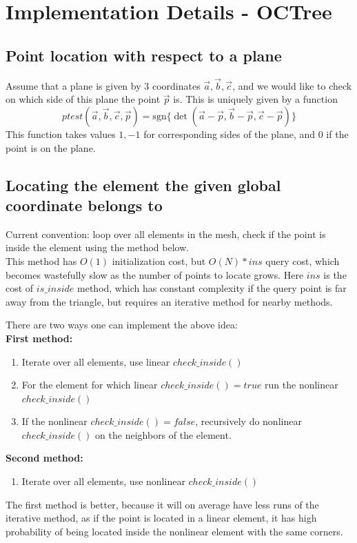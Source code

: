 \section{Implementation Details - OCTree}
\label{impl-octree}

\subsection{Point location with respect to a plane}

Assume that a plane is given by 3 coordinates $\vec{a}, \vec{b}, \vec{c}$, and we would like to check on which side of this plane the point $\vec{p}$ is. This is uniquely given by a function
\begin{equation}
\label{equation-point-plane-test}
	ptest(\vec{a}, \vec{b}, \vec{c}, \vec{p}) = \mathrm{sgn} \{ \det (\vec{a} - \vec{p}, \vec{b} - \vec{p}, \vec{c} - \vec{p}) \}
\end{equation}
\noindent
This function takes values $1,-1$ for corresponding sides of the plane, and $0$ if the point is on the plane.

\subsection{Locating the element the given global coordinate belongs to}
\label{subsection-locating-element}

\noindent
Current convention: loop over all elements in the mesh, check if the point is inside the element using the method below. \\


\noindent
This method has $O(1)$ initialization cost, but $O(N) * ins$ query cost, which becomes wastefully slow as the number of points to locate grows. Here $ins$ is the cost of $is\_inside$ method, which has constant complexity if the query point is far away from the triangle, but requires an iterative method for nearby methods.

\noindent
There are two ways one can implement the above idea: \\
\textbf{First method:}
\begin{enumerate}
	\item Iterate over all elements, use linear $check\_inside()$
	\item For the element for which linear $check\_inside() = true$ run the nonlinear $check\_inside()$
	\item If the nonlinear $check\_inside() = false$, recursively do nonlinear $check\_inside()$ on the neighbors of the element.
\end{enumerate}
\textbf{Second method:}
\begin{enumerate}
	\item Iterate over all elements, use nonlinear $check\_inside()$
\end{enumerate}
\noindent
The first method is better, because it will on average have less runs of the iterative method, as if the point is located in a linear element, it has high probability of being located inside the nonlinear element with the same corners. \\

